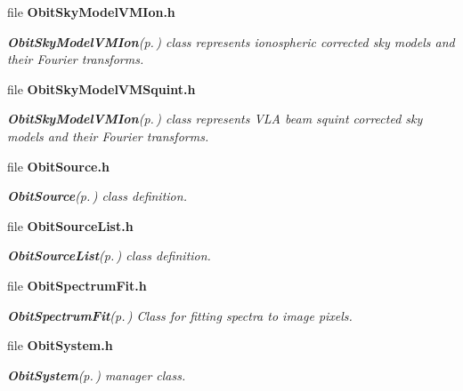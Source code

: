 \begin{CompactItemize}
\item 
file {\bf Obit\-Sky\-Model\-VMIon.h}
\begin{CompactList}\small\item\em {\bf Obit\-Sky\-Model\-VMIon}{\rm (p.\,\pageref{structObitSkyModelVMIon})} class represents ionospheric corrected sky models and their Fourier transforms. \item\end{CompactList}

\item 
file {\bf Obit\-Sky\-Model\-VMSquint.h}
\begin{CompactList}\small\item\em {\bf Obit\-Sky\-Model\-VMIon}{\rm (p.\,\pageref{structObitSkyModelVMIon})} class represents VLA beam squint corrected sky models and their Fourier transforms. \item\end{CompactList}

\item 
file {\bf Obit\-Source.h}
\begin{CompactList}\small\item\em {\bf Obit\-Source}{\rm (p.\,\pageref{structObitSource})} class definition. \item\end{CompactList}

\item 
file {\bf Obit\-Source\-List.h}
\begin{CompactList}\small\item\em {\bf Obit\-Source\-List}{\rm (p.\,\pageref{structObitSourceList})} class definition. \item\end{CompactList}

\item 
file {\bf Obit\-Spectrum\-Fit.h}
\begin{CompactList}\small\item\em {\bf Obit\-Spectrum\-Fit}{\rm (p.\,\pageref{structObitSpectrumFit})} Class for fitting spectra to image pixels. \item\end{CompactList}

\item 
file {\bf Obit\-System.h}
\begin{CompactList}\small\item\em {\bf Obit\-System}{\rm (p.\,\pageref{structObitSystem})} manager class. \item\end{CompactList}


\end{CompactItemize}
